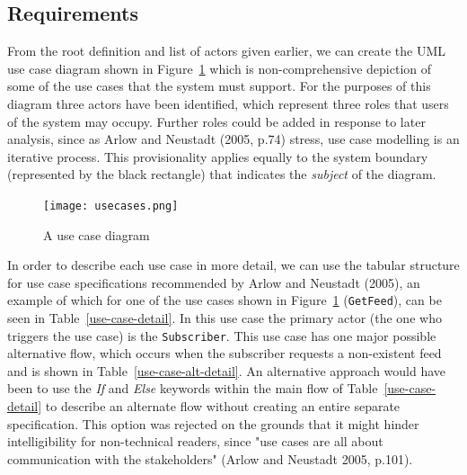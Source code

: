\documentclass{article}
\begin{document}
\subsection{Requirements}

From the root definition and list of actors given earlier, we can create the UML use case diagram shown in Figure~\ref{use-cases} which is non-comprehensive depiction of some of the use cases that the system must support. For the purposes of this diagram three actors have been identified, which represent three roles that users of the system may occupy. Further roles could be added in response to later analysis, since as Arlow and Neustadt (2005, p.74) stress, use case modelling is an iterative process. This provisionality applies equally to the system boundary (represented by the black rectangle) that indicates the \textit{subject} of the diagram.

\begin{figure}
  \texttt{[image: usecases.png]}
  \caption{A use case diagram}
  \label{use-cases}
\end{figure}

In order to describe each use case in more detail, we can use the tabular structure for use case specifications recommended by Arlow and Neustadt (2005), an example of which for one of the use cases shown in Figure~\ref{use-cases} (\texttt{GetFeed}), can be seen in Table~\ref{use-case-detail}. In this use case the primary actor (the one who triggers the use case) is the \texttt{Subscriber}. This use case has one major possible alternative flow, which occurs when the subscriber requests a non-existent feed and is shown in Table~\ref{use-case-alt-detail}. An alternative approach would have been to use the \textit{If} and \textit{Else} keywords within the main flow of Table~\ref{use-case-detail} to describe an alternate flow without creating an entire separate specification. This option was rejected on the grounds that it might hinder intelligibility for non-technical readers, since "use cases are all about communication with the stakeholders" (Arlow and Neustadt 2005, p.101).

\end{document}
